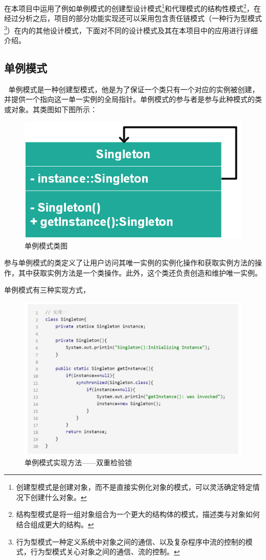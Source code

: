 \documentclass[article]{BJTU-thesis}
\begin{document}
在本项目中运用了例如单例模式的创建型设计模式\footnote{创建型模式是创建对象，而不是直接实例化对象的模式，可以灵活确定特定情况下创建什么对象。}和代理模式的结构性模式\footnote{结构型模式是将一组对象组合为一个更大的结构体的模式，描述类与对象如何结合组成更大的结构。}，在经过分析之后，项目的部分功能实现还可以采用包含责任链模式（一种行为型模式\footnote{行为型模式一种定义系统中对象之间的通信、以及复杂程序中流的控制的模式，行为型模式关心对象之间的通信、流的控制。}）在内的其他设计模式，下面对不同的设计模式及其在本项目中的应用进行详细介绍。
\subsection{单例模式}
	
单例模式是一种创建型模式，他是为了保证一个类只有一个对应的实例被创建，并提供一个指向这一单一实例的全局指针。单例模式的参与者是参与此种模式的类或对象。其类图如下图所示：

	 	\begin{figure}[!htbp]
		\centering
		\includegraphics[scale=1]{5.png}
		\caption{单例模式类图}
	\end{figure}

\newpage

参与单例模式的类定义了让用户访问其唯一实例的实例化操作和获取实例方法的操作，其中获取实例方法是一个类操作。此外，这个类还负责创造和维护唯一实例。

单例模式有三种实现方式，
	 	\begin{figure}[!htbp]
	\centering
	\includegraphics[scale=0.5]{6.png}
	\caption{单例模式实现方法——双重检验锁}
\end{figure}
\end{document}
